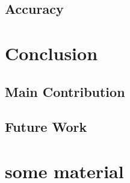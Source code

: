 \documentclass[mscthesis]{usiinfthesis}
\begin{document}
\section{Accuracy}

\chapter{Conclusion}
\label{ch:conc}
\glsresetall %

\section{Main Contribution}
\label{ch:conc_ach}

\section{Future Work}
\label{ch:conc_work}

\nocite{*}

\appendix %

\chapter{some material}

\backmatter


%
%
%
%
%

%

\printglossaries

\end{document}
